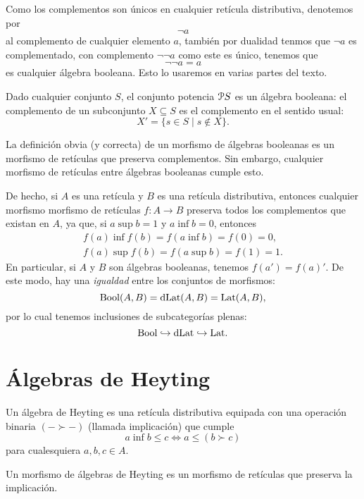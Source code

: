 Como los complementos son únicos en cualquier retícula distributiva, denotemos por \[\neg a\] 
al complemento de cualquier elemento $a$, también por dualidad tenmos que $\neg a$ es complementado,
con complemento $\neg\neg a$ como este es único, tenemos que \[\neg\neg a=a\] es cualquier álgebra booleana.
Esto lo usaremos en varias partes del texto.
\begin{example}
    Dado cualquier conjunto $S$, el conjunto potencia $\cal PS$ es un
    álgebra booleana: el complemento de un subconjunto $X\subseteq S$
    es el complemento en el sentido usual:
    \[
      X' = \{s\in S \mid s\not\in X\}
    .\]
\end{example}

\begin{remark}\label{obs:bool-plena-en-dlat}
La definición obvia (y correcta) de un morfismo de álgebras booleanas
es un morfismo de retículas que preserva complementos. Sin embargo,
cualquier morfismo de retículas entre álgebras booleanas cumple esto.

De hecho, si $A$ es una retícula y $B$ es una retícula distributiva,
entonces cualquier morfismo morfismo de retículas $f:A\to B$ preserva
todos los complementos que existan en $A$, ya que, si $a\sup b=1$
y $a\inf b=0$, entonces
\begin{align*}
  f(a)\inf f(b)=f(a\inf b)=f(0)=0, \\
  f(a)\sup f(b)=f(a\sup b)=f(1)=1.
\end{align*} 
En particular, si $A$ y $B$ son álgebras booleanas, tenemos
$f(a')=f(a)'$.
De este modo, hay una \emph{igualdad} entre los conjuntos de
morfismos:
\[
  \Bool(A,B) = \DLat(A,B) = \Lat(A,B)
,\]
por lo cual tenemos inclusiones de subcategorías plenas:
\begin{equation}
  \Bool \rmono \DLat \rmono \Lat.
\end{equation}
\end{remark}

\section{Álgebras de Heyting}
\label{ss:heyting}

\begin{definition}\label{defn:heyting}
  Un álgebra de Heyting es una retícula distributiva equipada con una
  operación binaria $(-\succ-)$ (llamada implicación) que cumple
  \begin{equation}\label{eq:defn-implicacion}
    a \inf b \leq c \iff a \leq (b\succ c)
  \end{equation}
  para cualesquiera $a,b,c\in A$.

  Un morfismo de álgebras de Heyting es un morfismo de retículas
  que preserva la implicación.
\end{definition}

